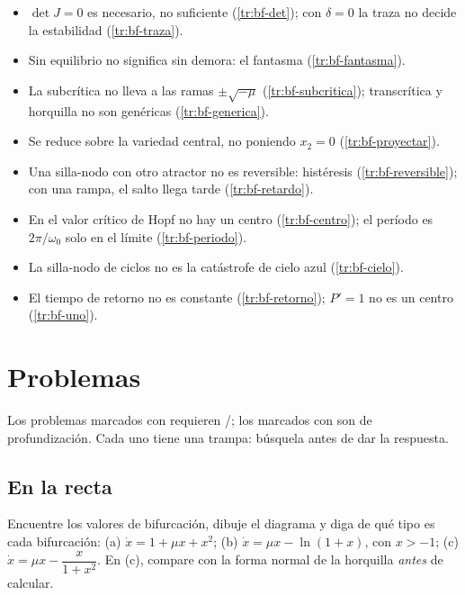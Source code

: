 \begin{trampa}[title={\faBug\hspace{0.45em}Las trampas del capítulo, en una caja}]{}
\begin{itemize}
  \item $\det J=0$ es necesario, no suficiente (\cref{tr:bf-det}); con $\delta=0$ la traza no decide la estabilidad (\cref{tr:bf-traza}).
  \item Sin equilibrio no significa sin demora: el fantasma (\cref{tr:bf-fantasma}).
  \item La subcrítica no lleva a las ramas $\pm\sqrt{-\mu}$ (\cref{tr:bf-subcritica}); transcrítica y horquilla no son genéricas (\cref{tr:bf-generica}).
  \item Se reduce sobre la variedad central, no poniendo $x_2=0$ (\cref{tr:bf-proyectar}).
  \item Una silla-nodo con otro atractor no es reversible: histéresis (\cref{tr:bf-reversible}); con una rampa, el salto llega tarde (\cref{tr:bf-retardo}).
  \item En el valor crítico de Hopf no hay un centro (\cref{tr:bf-centro}); el período es $2\pi/\omega_0$ solo en el límite (\cref{tr:bf-periodo}).
  \item La silla-nodo de ciclos no es la catástrofe de cielo azul (\cref{tr:bf-cielo}).
  \item El tiempo de retorno no es constante (\cref{tr:bf-retorno}); $P'=1$ no es un centro (\cref{tr:bf-uno}).
\end{itemize}
\end{trampa}

\section{Problemas}
\label{sec:bf-problemas}

Los problemas marcados con \etiquetaM{} requieren \matlab/\simulink; los marcados con \etiquetaEstrella{} son de profundización. Cada uno tiene una trampa: búsquela antes de dar la respuesta.

\subsection*{En la recta}

\begin{problema}\label{prob:bf-clasificar}
Encuentre los valores de bifurcación, dibuje el diagrama y diga de qué tipo es cada bifurcación: (a) $\dot x=1+\mu x+x^2$; (b) $\dot x=\mu x-\ln(1+x)$, con $x>-1$; (c) $\dot x=\mu x-\dfrac{x}{1+x^2}$. En (c), compare con la forma normal de la horquilla \emph{antes} de calcular.
\end{problema}

